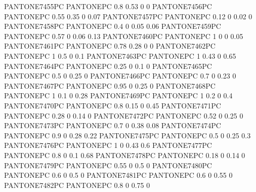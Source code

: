  {PANTONE7455PC} {PANTONE\SpotSpace PC} {0.8 0.53 0 0}
 {PANTONE7456PC} {PANTONE\SpotSpace PC} {0.55 0.35 0 0.07}
 {PANTONE7457PC} {PANTONE\SpotSpace PC} {0.12 0 0.02 0}
 {PANTONE7458PC} {PANTONE\SpotSpace PC} {0.4 0 0.05 0.06}
 {PANTONE7459PC} {PANTONE\SpotSpace PC} {0.57 0 0.06 0.13}
 {PANTONE7460PC} {PANTONE\SpotSpace PC} {1 0 0 0.05}
 {PANTONE7461PC} {PANTONE\SpotSpace PC} {0.78 0.28 0 0}
 {PANTONE7462PC} {PANTONE\SpotSpace PC} {1 0.5 0 0.1}
 {PANTONE7463PC} {PANTONE\SpotSpace PC} {1 0.43 0 0.65}
 {PANTONE7464PC} {PANTONE\SpotSpace PC} {0.25 0 0.1 0}
 {PANTONE7465PC} {PANTONE\SpotSpace PC} {0.5 0 0.25 0}
 {PANTONE7466PC} {PANTONE\SpotSpace PC} {0.7 0 0.23 0}
 {PANTONE7467PC} {PANTONE\SpotSpace PC} {0.95 0 0.25 0}
 {PANTONE7468PC} {PANTONE\SpotSpace PC} {1 0.1 0 0.28}
 {PANTONE7469PC} {PANTONE\SpotSpace PC} {1 0.2 0 0.4}
 {PANTONE7470PC} {PANTONE\SpotSpace PC} {0.8 0.15 0 0.45}
 {PANTONE7471PC} {PANTONE\SpotSpace PC} {0.28 0 0.14 0}
 {PANTONE7472PC} {PANTONE\SpotSpace PC} {0.52 0 0.25 0}
 {PANTONE7473PC} {PANTONE\SpotSpace PC} {0.7 0 0.38 0.08}
 {PANTONE7474PC} {PANTONE\SpotSpace PC} {0.9 0 0.28 0.22}
 {PANTONE7475PC} {PANTONE\SpotSpace PC} {0.5 0 0.25 0.3}
 {PANTONE7476PC} {PANTONE\SpotSpace PC} {1 0 0.43 0.6}
 {PANTONE7477PC} {PANTONE\SpotSpace PC} {0.8 0 0.1 0.68}
 {PANTONE7478PC} {PANTONE\SpotSpace PC} {0.18 0 0.14 0}
 {PANTONE7479PC} {PANTONE\SpotSpace PC} {0.55 0 0.5 0}
 {PANTONE7480PC} {PANTONE\SpotSpace PC} {0.6 0 0.5 0}
 {PANTONE7481PC} {PANTONE\SpotSpace PC} {0.6 0 0.55 0}
 {PANTONE7482PC} {PANTONE\SpotSpace PC} {0.8 0 0.75 0}
